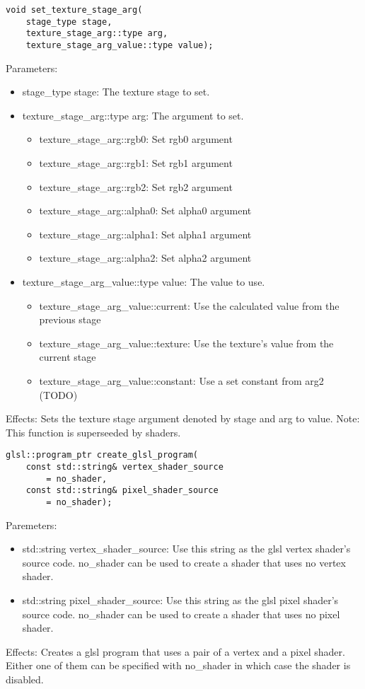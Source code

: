\documentclass{article}
\begin{document}
\begin{lstlisting}
void set_texture_stage_arg(
	stage_type stage,
	texture_stage_arg::type arg,
	texture_stage_arg_value::type value);
\end{lstlisting}
Parameters:
\begin{itemize}
\item stage\_type stage: The texture stage to set.
\item texture\_stage\_arg::type arg: The argument to set.
  \begin{itemize}
  \item texture\_stage\_arg::rgb0: Set rgb0 argument
  \item texture\_stage\_arg::rgb1: Set rgb1 argument
  \item texture\_stage\_arg::rgb2: Set rgb2 argument
  \item texture\_stage\_arg::alpha0: Set alpha0 argument
  \item texture\_stage\_arg::alpha1: Set alpha1 argument
  \item texture\_stage\_arg::alpha2: Set alpha2 argument
  \end{itemize}
\item texture\_stage\_arg\_value::type value: The value to use.
  \begin{itemize}
  \item texture\_stage\_arg\_value::current: Use the calculated value from the previous stage
  \item texture\_stage\_arg\_value::texture: Use the texture's value from the current stage
  \item texture\_stage\_arg\_value::constant: Use a set constant from arg2 (TODO)
  \end{itemize}
\end{itemize}
Effects: Sets the texture stage argument denoted by stage and arg to value.
Note: This function is superseeded by shaders.

\begin{lstlisting}
glsl::program_ptr create_glsl_program(
	const std::string& vertex_shader_source
		= no_shader,
	const std::string& pixel_shader_source
		= no_shader);
\end{lstlisting}
Paremeters:
\begin{itemize}
\item std::string vertex\_shader\_source: Use this string as the glsl vertex shader's source code.
no\_shader can be used to create a shader that uses no vertex shader.
\item std::string pixel\_shader\_source: Use this string as the glsl pixel shader's source code.
no\_shader can be used to create a shader that uses no pixel shader.
\end{itemize}
Effects: Creates a glsl program that uses a pair of a vertex and a pixel shader.
Either one of them can be specified with no\_shader in which case the shader is disabled.
\end{document}
